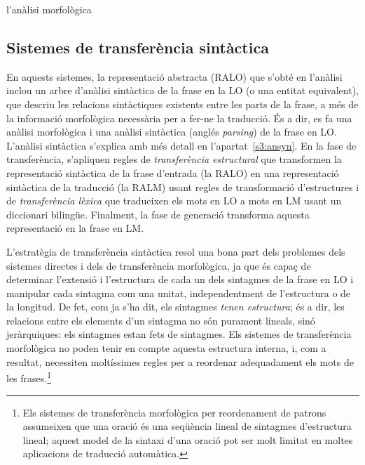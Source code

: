 \begin{persabermes}{l'anàlisi morfològica}


\mbox{}
\end{persabermes}




\subsection{Sistemes de transferència sintàctica} 
\label{s3:transyn}

En aquests sistemes, la representació abstracta (RALO) que s'obté en
l'anà\-li\-si inclou un arbre d'anàlisi sintàctica de la frase en la
LO (o una entitat equivalent), que descriu les relacions sintàctiques
existents entre les parts de la frase, a més de la informació
morfològica necessària per a fer-ne la traducció. És a dir, es fa una
anàlisi morfològica i una anàlisi sintàctica (anglés \emph{parsing})
de la frase en LO. L'anàlisi sintàctica s'explica amb més detall en
l'apartat~\ref{s3:ansyn}.  En la fase de transferència, s'apliquen
regles de \emph{transferència estructural} que transformen la
representació sintàctica de la frase d'entrada (la RALO) en una
representació sintàctica de la traducció (la RALM) usant regles de
transformació d'estructures i de \emph{transferència lèxica} que
tradueixen els mots en LO a mots en LM usant un diccionari bilingüe.
Finalment, la fase de generació transforma aquesta representació en la
frase en LM.

L'estratègia de transferència sintàctica resol una bona
part dels problemes dels sistemes directes i dels de transferència
morfològica, ja que és capaç de
determinar l'extensió i l'estructura de cada un dels sintagmes
de la frase en LO i manipular cada sintagma com una unitat, independentment
de l'estructura o de la longitud. 
De fet, com ja s'ha dit, els sintagmes \emph{tenen estructura}; és a
dir, les relacions entre els elements d'un sintagma no són purament
lineals, sinó jeràrquiques: els sintagmes estan fets de sintagmes.
Els sistemes de transferència morfològica no poden tenir 
en compte aquesta
estructura interna, i, com a resultat, necessiten moltíssimes regles
per a reordenar adequadament els mots de les frases.\footnote{Els sistemes de
transferència morfològica per reordenament de patrons assumeixen que
una oració és una seqüència lineal de sintagmes d'estructura
lineal; aquest model de la sintaxi d'una oració pot ser molt limitat en
moltes aplicacions de traducció automàtica.}



